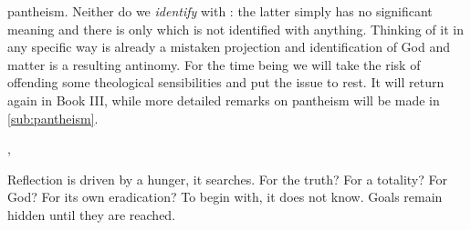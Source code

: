 pantheism. Neither do we {\em identify}  with : the latter
simply has no significant meaning and there is only  which is
not identified with anything. Thinking of it in any specific way is already a
mistaken projection and identification of God and matter is a resulting
antinomy.
For the time being we will take the risk of
offending some theological sensibilities and put the issue to rest. It will
return again in Book III, while more detailed remarks on pantheism will be made in
\ref{sub:pantheism}.
%


\sep


\pa Reflection is driven by a hunger, it searches. For the truth? For a totality? For 
God? For its own eradication? To begin with, 
it does not know. Goals remain hidden until they are reached.


